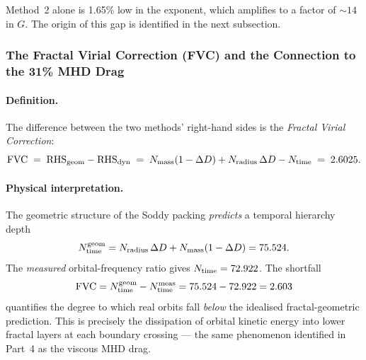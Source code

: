 \documentclass[11pt,a4paper]{article}
\begin{document}
        Method~2 alone is 1.65\% low in the exponent, which amplifies
        to a factor of $\sim\!14$ in $G$.  The origin of this gap is
        identified in the next subsection.

      \subsubsection{The Fractal Virial Correction (FVC) and the
        Connection to the 31\% MHD Drag}

        \paragraph{Definition.}
        The difference between the two methods' right-hand sides is
        the \emph{Fractal Virial Correction}:
        \begin{equation}
          \mathrm{FVC}
          \;=\; \mathrm{RHS}_{\rm geom} - \mathrm{RHS}_{\rm dyn}
          \;=\; N_{\rm mass}(1-\Delta D)
                + N_{\rm radius}\,\Delta D
                - N_{\rm time}
          \;=\; 2.6025.
          \label{eq:FVC}
        \end{equation}

        \paragraph{Physical interpretation.}
        The geometric structure of the Soddy packing \emph{predicts} a
        temporal hierarchy depth
        \begin{equation}
          N_{\rm time}^{\rm geom}
          = N_{\rm radius}\,\Delta D + N_{\rm mass}(1-\Delta D)
          = 75.524.
          \label{eq:Ntime_geom}
        \end{equation}
        The \emph{measured} orbital-frequency ratio gives $N_{\rm time}
        = 72.922$.  The shortfall
        \begin{equation}
          \mathrm{FVC}
          = N_{\rm time}^{\rm geom} - N_{\rm time}^{\rm meas}
          = 75.524 - 72.922
          = 2.603
          \label{eq:FVC_interp}
        \end{equation}
        quantifies the degree to which real orbits fall \emph{below}
        the idealised fractal-geometric prediction.  This is precisely
        the dissipation of orbital kinetic energy into lower fractal
        layers at each boundary crossing — the same phenomenon
        identified in Part~4 as the viscous MHD drag.
\end{document}
